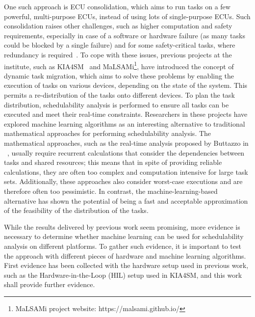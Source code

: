 One such approach is ECU consolidation, which aims to run tasks on a few powerful, multi-purpose ECUs, instead of using lots of single-purpose ECUs. Such consolidation raises other challenges, such as higher computation and safety requirements, especially in case of a software or hardware failure (as many tasks could be blocked by a single failure) and for some safety-critical tasks, where redundancy is required~\parencite{mundhenk1}. To cope with these issues, previous projects at the institute, such as KIA4SM~\parencite{kia1} and MaLSAMi\footnote{MaLSAMi project website: https://malsami.github.io/}, have introduced the concept of dynamic task migration, which aims to solve these problems by enabling the execution of tasks on various devices, depending on the state of the system. This permits a re-distribution of the tasks onto different devices. To plan the task distribution, schedulability analysis is performed to ensure all tasks can be executed and meet their real-time constraints. Researchers in these projects have explored machine learning algorithms as an interesting alternative to traditional mathematical approaches for performing schedulability analysis. The mathematical approaches, such as the real-time analysis proposed by Buttazzo in ~\parencite{buttazzo1}, usually require recurrent calculations that consider the dependencies between tasks and shared resources; this means that in spite of providing reliable calculations, they are often too complex and computation intensive for large task sets. Additionally, these approaches also consider worst-case executions and are therefore often too pessimistic. In contrast, the machine-learning-based alternative has shown the potential of being a fast and acceptable approximation of the feasibility of the distribution of the tasks. 

While the results delivered by previous work seem promising, more evidence is necessary to determine whether machine learning can be used for schedulability analysis on different platforms. To gather such evidence, it is important to test the approach with different pieces of hardware and machine learning algorithms. First evidence has been collected with the hardware setup used in previous work, such as the Hardware-in-the-Loop (HIL) setup used in KIA4SM, and this work shall provide further evidence.

